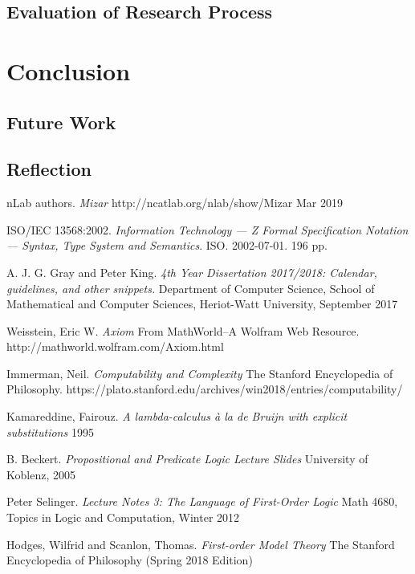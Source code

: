 \documentclass[11pt]{report}
\theoremstyle{definition}
\theoremstyle{theorem}
\theoremstyle{lemma}
\begin{document}
\section{Evaluation of Research Process}

\chapter{Conclusion}
\section{Future Work}
\section{Reflection}

\begin{thebibliography}{9}
nLab authors.
\textit{Mizar}
http://ncatlab.org/nlab/show/Mizar
Mar 2019

ISO/IEC 13568:2002. 
\textit{Information Technology — Z Formal Specification Notation — Syntax, Type System and Semantics}. 
ISO. 2002-07-01. 196 pp.

A. J. G. Gray and Peter King. 
\textit{4th Year Dissertation 2017/2018: Calendar, guidelines, and
other snippets.} 
Department of Computer Science, School of Mathematical and Computer Sciences, Heriot-Watt University, September 2017

Weisstein, Eric W.
\textit{Axiom}
From MathWorld--A Wolfram Web Resource. http://mathworld.wolfram.com/Axiom.html

Immerman, Neil.
\textit{Computability and Complexity}
The Stanford Encyclopedia of Philosophy. https://plato.stanford.edu/archives/win2018/entries/computability/

Kamareddine, Fairouz.
\textit{A lambda-calculus à la de Bruijn with explicit substitutions}
1995

B. Beckert.
\textit{Propositional and Predicate Logic Lecture Slides}
University of Koblenz, 2005

Peter Selinger.
\textit{Lecture Notes 3: The Language of First-Order Logic}
Math 4680, Topics in Logic and Computation, Winter 2012

Hodges, Wilfrid and Scanlon, Thomas.
\textit{First-order Model Theory}
The Stanford Encyclopedia of Philosophy (Spring 2018 Edition)


\end{thebibliography}
\end{document}
